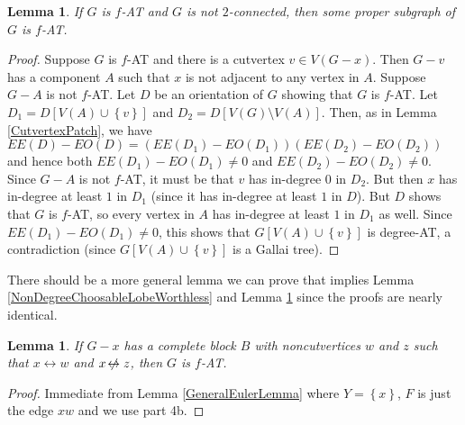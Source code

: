 \documentclass[12pt]{article}
\theoremstyle{plain}
\newtheorem{lem}[thm]{Lemma}
\theoremstyle{definition}
\theoremstyle{remark}
\newcommand{\set}[1]{\left\{ #1 \right\}}
\def\adj{\leftrightarrow}
\def\nonadj{\not\!\leftrightarrow}
\def\adj{\leftrightarrow}
\begin{document}
\begin{lem}\label{GIs2Connected}
	If $G$ is $f$-AT and $G$ is not $2$-connected, then some proper subgraph of $G$ is $f$-AT.
\end{lem}
\begin{proof}
	Suppose $G$ is $f$-AT and there is a cutvertex $v \in V(G-x)$.  Then $G-v$ has a component $A$ such that $x$ is not adjacent to any vertex in $A$.  Suppose $G-A$ is not $f$-AT. Let $D$ be an orientation of $G$ showing that $G$ is $f$-AT. Let $D_1 = D[V(A) \cup \set{v}]$ and $D_2 = D[V(G)\setminus V(A)]$.  Then, as in Lemma \ref{CutvertexPatch}, we have $EE(D) - EO(D) = (EE(D_1) - EO(D_1))(EE(D_2) - EO(D_2))$ and hence both $EE(D_1) - EO(D_1) \ne 0$ and $EE(D_2) - EO(D_2) \ne 0$.  Since $G - A$ is not $f$-AT, it must be that $v$ has in-degree $0$ in $D_2$.  But then $x$ has in-degree at least $1$ in $D_1$ (since it has in-degree at least $1$ in $D$).  But $D$ shows that $G$ is $f$-AT, so every vertex in $A$ has in-degree at least $1$ in $D_1$ as well.  Since $EE(D_1) - EO(D_1) \ne 0$, this shows that $G[V(A) \cup \set{v}]$ is degree-AT, a contradiction (since $G[V(A) \cup \set{v}]$ is a Gallai tree).
\end{proof}

There should be a more general lemma we can prove that implies Lemma \ref{NonDegreeChoosableLobeWorthless} and Lemma \ref{GIs2Connected} since the proofs are nearly identical.

\begin{lem}
	If $G-x$ has a complete block $B$ with noncutvertices $w$ and $z$ such that $x \adj w$ and $x \nonadj z$, then $G$ is $f$-AT.
\end{lem}
\begin{proof}
	Immediate from Lemma \ref{GeneralEulerLemma} where $Y = \set{x}$, $F$ is just the edge $xw$ and we use part 4b.
\end{proof}



\end{document}
